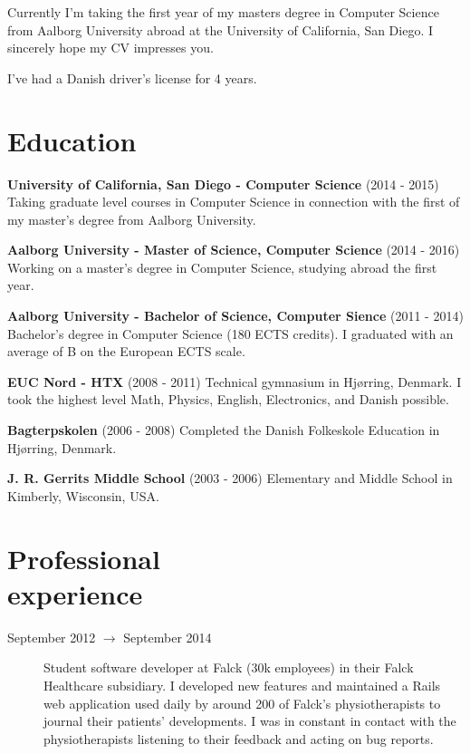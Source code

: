\documentclass[margin,line]{resume}
\begin{document}
\begin{resume}
    Currently I'm taking the first year of my masters degree in
    Computer Science from Aalborg University abroad at the University
    of California, San Diego. I sincerely hope my CV impresses you.
    
    I've had a Danish driver's license for 4 years.

    \section{\mysidestyle Education}

    \textbf{University of California, San Diego - Computer Science}
    (2014 - 2015) Taking graduate level courses in Computer Science
    in connection with the first of my master's degree from Aalborg
    University.

    \textbf{Aalborg University - Master of Science, Computer Science}
    (2014 - 2016) Working on a master's degree in Computer
    Science, studying abroad the first year.

    \textbf{Aalborg University - Bachelor of Science, Computer Sience}
    (2011 - 2014) Bachelor's degree in Computer Science (180 ECTS
    credits). I graduated with an average of B on the European ECTS
    scale.      

    \textbf{EUC Nord - HTX} (2008 - 2011) Technical gymnasium in
    Hjørring, Denmark. I took the highest level Math, Physics, English,
    Electronics, and Danish possible.
    
    \textbf{Bagterpskolen} (2006 - 2008) Completed the Danish
    Folkeskole Education in Hjørring, Denmark.

    \textbf{J. R. Gerrits Middle School} (2003 - 2006) Elementary and 
    Middle School in Kimberly, Wisconsin, USA.

\section{\mysidestyle Professional\\experience}\vspace{1mm}
\begin{description}

  \item[September 2012 $\rightarrow$ September 2014] Student software
  developer at Falck (30k employees) in their Falck Healthcare
  subsidiary. I developed new features and maintained a Rails web
  application used daily by around 200 of Falck's physiotherapists to
  journal their patients' developments. I was in constant in contact
  with the physiotherapists listening to their feedback and acting on
  bug reports.


\end{description}
\end{resume}
\end{document}
